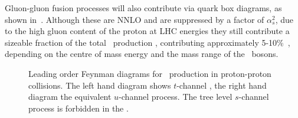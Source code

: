 Gluon-gluon fusion processes will also contribute via quark box diagrams, as
shown in~. Although these are NNLO and are suppressed by a
factor of $\alpha_s^2$, due to the high gluon content of the proton at LHC
energies they still contribute a sizeable fraction of the total \ZZ\ production
\cx, contributing approximately 5-10\%~\cite{Campbell:2011}, depending on the
centre of mass energy and the mass range of the \Z\ bosons.

\begin{figure}
\centering
    \hspace{10mm}
        \vspace{8mm}
\caption[Leading order Feynman diagrams for \ZZ\ production in proton-proton
collisions.]{Leading order Feynman diagrams for \ZZ\ production in proton-proton
collisions. The left hand diagram shows $t$-channel \qqZZ, the right hand
diagram the equivalent $u$-channel process. The tree level $s$-channel process is forbidden
in the \sm.}
\label{fig:theoryzz-fd-qqZZ}
\end{figure}

